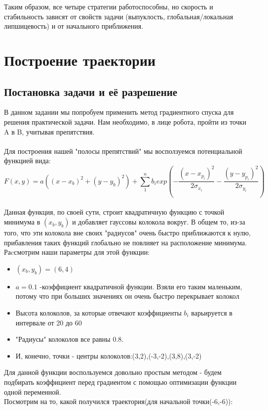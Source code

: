 \documentclass[a4paper,12pt]{article}
\begin{document}
Таким образом, все четыре стратегии работоспособны, но скорость и стабильность зависят от свойств задачи (выпуклость, глобальная/локальная липшицевость) и от начального приближения. 
\section{Построение траектории}
\subsection{Постановка задачи и её разрешение}
В данном задании мы попробуем применить метод градиентного спуска для решения практической задачи. Нам необходимо, в лице робота, пройти из точки A в B, учитывая препятствия.
\\
\\
Для построения нашей "полосы препятствий" мы восползуемся потенциальной функцией вида:
$$F(x,y) = a((x-x_b)^2+(y-y_b)^2)+\sum_1^n b_iexp({-\frac{{(x-x_{p_i})}^2}{2\sigma_{x_i}}-\frac{{(y-y_{p_i})}^2}{2\sigma_{y_i}}})$$
\\
Данная функция, по своей сути, строит квадратичную функцию с точкой минимума в $(x_b,y_b)$ и добавляет гауссовы колокола вокруг. В общем то, из-за того, что эти колокола вне своих "радиусов" очень быстро приближаются к нулю, прибавления таких функций глобально не повлияет на расположение минимума.
\\
Раcсмотрим наши параметры для этой функции:
\begin{itemize}
\item $(x_b,y_b) = (6,4)$
\item $a = 0.1$ -коэффициент квадратичной функции. Взяли его таким маленьким, потому что при больших значениях он очень быстро перекрывает колокол
\item Высота колоколов, за которые отвечают коэффициенты $b_i$ варьируется в интервале от 20 до 60
\item "Радиусы" колоколов все равны 0.8.
\item И, конечно, точки - центры колоколов:(3,2),(-3,-2),(3,8),(3,-2)
\end{itemize}
Для данной функции воспользуемся довольно простым методом - будем подбирать коэффициент перед градиентом с помощью оптимизации функции одной переменной. \\[0.5em]
Посмотрим на то, какой получился траектория(для начальной точки(-6,-6)):
\end{document}

